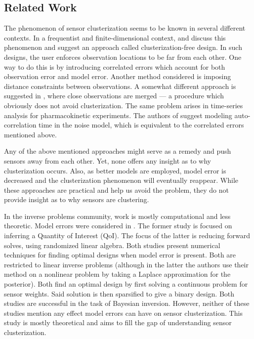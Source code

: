 \subsection{Related Work}
The phenomenon of sensor clusterization seems to be known in several
different contexts. In a frequentist and finite-dimensional context,
\cite{fedorov1996} and \cite[chapter 2.4.3]{Ucinski05} discuss this
phenomenon and suggest an approach called clusterization-free design.
In such designs, the user enforces observation locations to be far
from each other. One way to do this is by introducing correlated
errors which account for both observation error and model
error. Another method considered is imposing distance constraints
between observations. A somewhat different approach is suggested in
\cite[page 49]{fedorov2012}, where close observations are merged --- a
procedure which obviously does not avoid clusterization. The same
problem arises in time-series analysis for pharmacokinetic
experiments. The authors of \cite{hooker2009} suggest modeling
auto-correlation time in the noise model, which is equivalent to the
correlated errors mentioned above.

Any of the above mentioned approaches might serve as a remedy and push
sensors away from each other. Yet, none offers any insight as to why
clusterization occurs. Also, as better models are employed, model
error is decreased and the clusterization phenomenon will eventually
reappear. While these approaches are practical and help us avoid the
problem, they do not provide insight as to why sensors are clustering.

In the inverse problems community, work is mostly computational and
less theoretic. Model errors were considered in \cite{attia2020,
  koval2020}. The former study is focused on inferring a Quantity of
Interest (QoI). The focus of the latter is reducing forward solves,
using randomized linear algebra. Both studies present numerical
techniques for finding optimal designs when model error is
present. Both are restricted to linear inverse problems (although in
the latter the authors use their method on a nonlinear problem by
taking a Laplace approximation for the posterior). Both find an
optimal design by first solving a continuous problem for sensor
weights. Said solution is then sparsified to give a binary
design. Both studies are successful in the task of Bayesian
inversion. However, neither of these studies mention any effect model
errors can have on sensor clusterization. This study is mostly
theoretical and aims to fill the gap of understanding sensor
clusterization.


